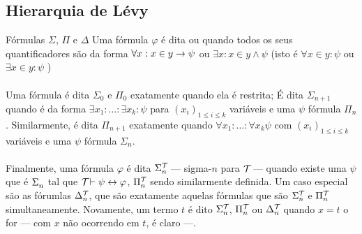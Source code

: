         \subsection{Hierarquia de Lévy}
            \begin{definition}{Fórmulas $\Sigma$, $\Pi$ e $\Delta$}
                Uma fórmula $\varphi$ é dita  ou  quando todos os 
                seus quantificadores são da forma $\forall x : x\in y \rightarrow \psi$ ou 
                $\exists x : x\in y \land \psi$
                (isto é $\forall x\in y : \psi$ ou $\exists x\in y : \psi$ )
            \paragraph{}
                Uma fórmula é dita $\Sigma_0$ e $\Pi_0$ exatamente quando ela é restrita; É dita
                $\Sigma_{n+1}$ quando é da forma $\exists x_1:\ldots:\exists x_k: \psi$ para 
                $(x_i)_{1\leq i\leq k}$ variáveis e uma 
                $\psi$ fórmula $\Pi_n$. Similarmente, é dita $\Pi_{n+1}$ exatamente quando 
                $\forall x_1:\ldots:\forall x_k\psi$ com $(x_i)_{1\leq i\leq k}$ variáveis 
                e uma $\psi$ fórmula $\Sigma_n$.
            \paragraph{}
                Finalmente, uma fórmula $\varphi$ é dita $\Sigma^{\mathcal{T}_{}}_{n}$ --- sigma-$n$ para 
                $\mathcal{T}_{}$ --- quando existe uma $\psi$ que é $\Sigma^{}_{n}$ tal que $\mathcal{T}_{}\vdash\psi\leftrightarrow\varphi$,
                $\Pi^{\mathcal{T}_{}}_{n}$ sendo similarmente definida.
                Um caso especial são as fórumlas $\Delta^{\mathcal{T}_{}}_{n}$, que são exatamente aquelas 
                fórmulas que são $\Sigma^{\mathcal{T}_{}}_n$ e $\Pi^{\mathcal{T}_{}}_n$ simultaneamente. 
                Novamente, um termo $t$
                é dito $\Sigma^{\mathcal{T}_{}}_{n}$, $\Pi^{\mathcal{T}_{}}_{n}$ ou $\Delta^{\mathcal{T}_{}}_{n}$ 
                quando $x = t$ o for --- com $x$ não ocorrendo em $t$, é claro ---.
            \end{definition}
